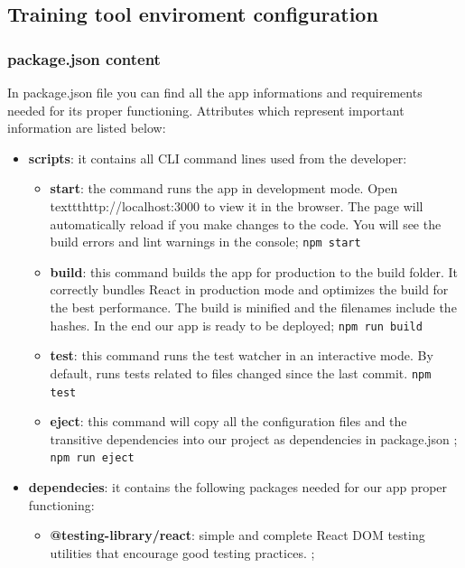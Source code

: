 	\subsection{Training tool enviroment configuration}
	
	
		\subsubsection{package.json content}
In package.json file you can find all the app informations and requirements needed for its proper functioning. Attributes which represent important information are listed below:
		\begin{itemize}
			\item\textbf{scripts}: it contains all CLI command lines used from the developer: 
				\begin{itemize}
				\item\textbf{start}: the command runs the app in development mode. Open texttt{http://localhost:3000} to view it in the browser. The page will automatically reload if you make changes to the code. You will see the build errors and lint warnings in the console;
				\newline\texttt{npm start}
				\item\textbf{build}: this command builds the app for production to the build folder. It correctly bundles React in production mode and optimizes the build for the best performance. The build is minified and the filenames include the hashes. In the end our app is ready to be deployed;
				\newline\texttt{npm run build}
				\item\textbf{test}: this command runs the test watcher in an interactive mode. By default, runs tests related to files changed since the last commit.
				\newline\texttt{npm test}
				\item\textbf{eject}: this command will copy all the configuration files and the transitive dependencies into our project as dependencies in package.json ;
				\newline\texttt{npm run eject}
			\end{itemize}
			\item\textbf{dependecies}: it contains the following packages needed for our app proper functioning:
			\begin{itemize}
				\item\textbf{@testing-library/react}: simple and complete React DOM testing utilities that encourage good testing practices. ;

\end{itemize}
\end{itemize}
